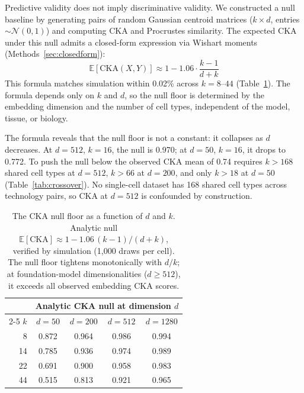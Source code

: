 \documentclass[11pt]{article}
\begin{document}
Predictive validity does not imply discriminative validity. We
constructed a null baseline by generating pairs of random Gaussian
centroid matrices ($k \times d$, entries $\sim \mathcal{N}(0,1)$) and
computing CKA and Procrustes similarity. The expected CKA under this
null admits a closed-form expression via Wishart moments
(Methods~\ref{sec:closedform}):
\begin{equation}
\label{eq:cka_null}
\mathbb{E}[\mathrm{CKA}(X, Y)] \approx 1 - 1.06 \cdot \frac{k-1}{d+k}
\end{equation}
This formula matches simulation within 0.02\% across $k = 8$--$44$
(Table~\ref{tab:nullfloor}). The formula depends only on $k$ and $d$,
so the null floor is determined by the embedding dimension and the
number of cell types, independent of the model, tissue, or biology.

The formula reveals that the null floor is not a constant: it collapses
as $d$ decreases. At $d = 512$, $k = 16$, the null is 0.970; at
$d = 50$, $k = 16$, it drops to 0.772. To push the null below the
observed CKA mean of 0.74 requires $k > 168$ shared cell types at
$d = 512$, $k > 66$ at $d = 200$, and only $k > 18$ at $d = 50$
(Table~\ref{tab:crossover}). No single-cell dataset has 168 shared cell
types across technology pairs, so CKA at $d = 512$ is confounded by
construction.

\begin{table}[t]
\centering
\caption{The CKA null floor as a function of $d$ and $k$. Analytic null
$\mathbb{E}[\mathrm{CKA}] \approx 1 - 1.06\,(k{-}1)/(d{+}k)$,
verified by simulation (1,000 draws per cell). The null floor tightens
monotonically with $d/k$; at foundation-model dimensionalities
($d \geq 512$), it exceeds all observed embedding CKA scores.}
\label{tab:nullfloor}
\small
\begin{tabular}{@{}rcccc@{}}
\toprule
& \multicolumn{4}{c}{Analytic CKA null at dimension $d$} \\
\cmidrule(lr){2-5}
$k$ & $d = 50$ & $d = 200$ & $d = 512$ & $d = 1280$ \\
\midrule
8  & 0.872 & 0.964 & 0.986 & 0.994 \\
14 & 0.785 & 0.936 & 0.974 & 0.989 \\
22 & 0.691 & 0.900 & 0.958 & 0.983 \\
44 & 0.515 & 0.813 & 0.921 & 0.965 \\
\bottomrule
\end{tabular}
\end{table}
\end{document}
